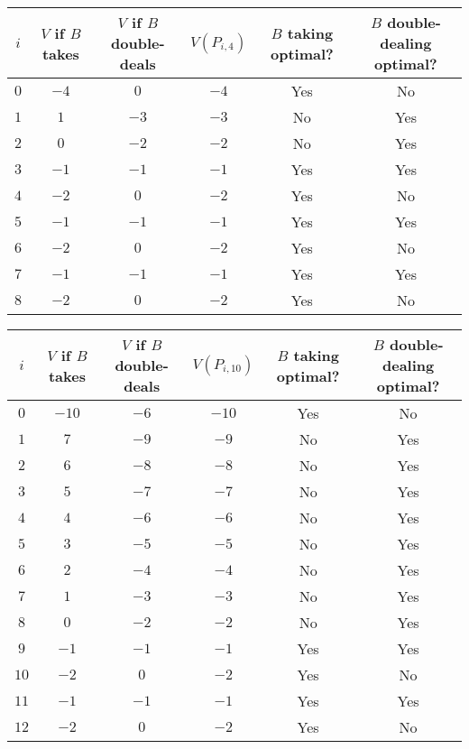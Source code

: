 \documentclass[a4paper,twocolumn]{article}
\begin{document}
\begin{table*}[p]
  \centering
  \begin{tabular}{c c c c c c}
    $i$ & $V$ if $B$ takes & $V$ if $B$ double-deals & $V(P_{i,4})$ & $B$ taking optimal? & $B$ double-dealing optimal? \\
    \hline
    $0$ & $-4$ & $0$ & $-4$ & Yes & No \\
    $1$ & $1$ & $-3$ & $-3$ & No & Yes \\
    $2$ & $0$ & $-2$ & $-2$ & No & Yes \\
    $3$ & $-1$ & $-1$ & $-1$ & Yes & Yes \\
    $4$ & $-2$ & $0$ & $-2$ & Yes & No \\
    $5$ & $-1$ & $-1$ & $-1$ & Yes & Yes \\
    $6$ & $-2$ & $0$ & $-2$ & Yes & No \\
    $7$ & $-1$ & $-1$ & $-1$ & Yes & Yes \\
    $8$ & $-2$ & $0$ & $-2$ & Yes & No
  \end{tabular}
  \caption{$k=4$}
  \label{vpik4}
\end{table*}

\begin{table*}[p]
  \centering
  \begin{tabular}{c c c c c c}
    $i$ & $V$ if $B$ takes & $V$ if $B$ double-deals & $V(P_{i,10})$ & $B$ taking optimal? & $B$ double-dealing optimal? \\
    \hline
    $0$ & $-10$ & $-6$ & $-10$ & Yes & No \\
    $1$ & $7$ & $-9$ & $-9$ & No & Yes \\
    $2$ & $6$ & $-8$ & $-8$ & No & Yes \\
    $3$ & $5$ & $-7$ & $-7$ & No & Yes \\
    $4$ & $4$ & $-6$ & $-6$ & No & Yes \\
    $5$ & $3$ & $-5$ & $-5$ & No & Yes \\
    $6$ & $2$ & $-4$ & $-4$ & No & Yes \\
    $7$ & $1$ & $-3$ & $-3$ & No & Yes \\
    $8$ & $0$ & $-2$ & $-2$ & No & Yes \\
    $9$ & $-1$ & $-1$ & $-1$ & Yes & Yes \\
    $10$ & $-2$ & $0$ & $-2$ & Yes & No \\
    $11$ & $-1$ & $-1$ & $-1$ & Yes & Yes \\
    $12$ & $-2$ & $0$ & $-2$ & Yes & No
  \end{tabular}
  \caption{$k=10$}
  \label{vpik10}
\end{table*}
\end{document}
